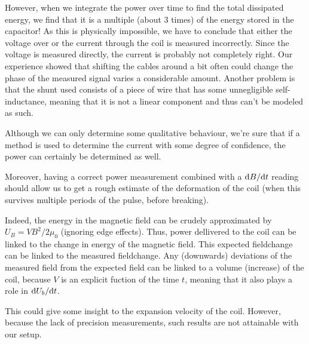 However, when we integrate the power over time to find the total dissipated 
energy, we find that it is a multiple (about 3 times) of the energy stored 
in the capacitor! As this is physically impossible, we have to conclude 
that either the voltage over or the current through the coil is measured 
incorrectly. Since the voltage is measured directly, the current is 
probably not completely right.  Our experience showed that shifting the 
cables around a bit often could change the phase of the measured signal 
varies a considerable amount.  Another problem is that the shunt used 
consists of a piece of wire that has some unnegligible self-inductance, 
meaning that it is not a linear component and thus can't be modeled as 
such.


Although we can only determine some qualitative behaviour, we're sure that if a 
method is used to determine the current with some degree of confidence, the 
power can certainly be determined as well.

Moreover, having a correct power measurement combined with a 
$\mathrm d B / \mathrm d t$ reading should allow us to get a rough estimate of the 
deformation of the coil (when this survives multiple periods of the pulse, 
before breaking).

Indeed, the energy in the magnetic field can be crudely approximated by 
$U_B = V B^2/2\mu_0$ (ignoring edge effects).  Thus, power dellivered to 
the coil can be linked to the change in energy of the magnetic field. This 
expected fieldchange can be linked to the measured fieldchange. Any 
(downwards) deviations of the measured field from the expected field can be 
linked to a volume (increase) of the coil, because $V$ is an explicit 
fuction of the time $t$, meaning that it also plays a role in 
$\mathrm d U_b / \mathrm d t$.

This could give some insight to the expansion velocity of the coil.  
However, because the lack of precision measurements, such results are not 
attainable with our setup.


